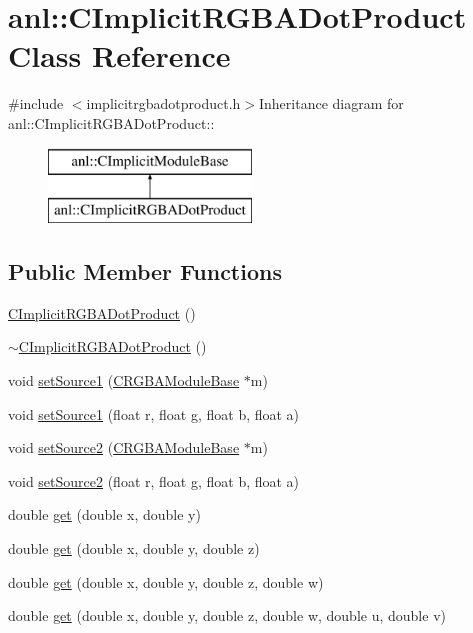 \hypertarget{classanl_1_1CImplicitRGBADotProduct}{
\section{anl::CImplicitRGBADotProduct Class Reference}
\label{classanl_1_1CImplicitRGBADotProduct}
}


{\ttfamily \#include $<$implicitrgbadotproduct.h$>$}Inheritance diagram for anl::CImplicitRGBADotProduct::\begin{figure}[H]
\begin{center}
\leavevmode
\includegraphics[height=2cm]{classanl_1_1CImplicitRGBADotProduct}
\end{center}
\end{figure}
\subsection*{Public Member Functions}
\begin{DoxyCompactItemize}
\item 
\hyperlink{classanl_1_1CImplicitRGBADotProduct_aef30acf03ca5aeffe0e43b2ff4675cf6}{CImplicitRGBADotProduct} ()
\item 
\hyperlink{classanl_1_1CImplicitRGBADotProduct_a759e4c4c9e1e7e7f4a1b4d562d9e8c96}{$\sim$CImplicitRGBADotProduct} ()
\item 
void \hyperlink{classanl_1_1CImplicitRGBADotProduct_a37a08bf3db051f9a1ff4ca8d1dbc9d01}{setSource1} (\hyperlink{classanl_1_1CRGBAModuleBase}{CRGBAModuleBase} $\ast$m)
\item 
void \hyperlink{classanl_1_1CImplicitRGBADotProduct_a003542de9b9e5cb662cf89ab301f4da9}{setSource1} (float r, float g, float b, float a)
\item 
void \hyperlink{classanl_1_1CImplicitRGBADotProduct_a3b95450f5a58acd5842278ae7a9068ce}{setSource2} (\hyperlink{classanl_1_1CRGBAModuleBase}{CRGBAModuleBase} $\ast$m)
\item 
void \hyperlink{classanl_1_1CImplicitRGBADotProduct_ac216b0c7ee189e09445c598e618f1857}{setSource2} (float r, float g, float b, float a)
\item 
double \hyperlink{classanl_1_1CImplicitRGBADotProduct_ad2d4c06f27551fee761b9736689c971a}{get} (double x, double y)
\item 
double \hyperlink{classanl_1_1CImplicitRGBADotProduct_aaf1fa4fa39be36a09dde553b73a14537}{get} (double x, double y, double z)
\item 
double \hyperlink{classanl_1_1CImplicitRGBADotProduct_ac38f2572f66e335ce9bb1e59b2fc7199}{get} (double x, double y, double z, double w)
\item 
double \hyperlink{classanl_1_1CImplicitRGBADotProduct_a8ffc86bb80adb25aa80ae93e6269d394}{get} (double x, double y, double z, double w, double u, double v)
\end{DoxyCompactItemize}
